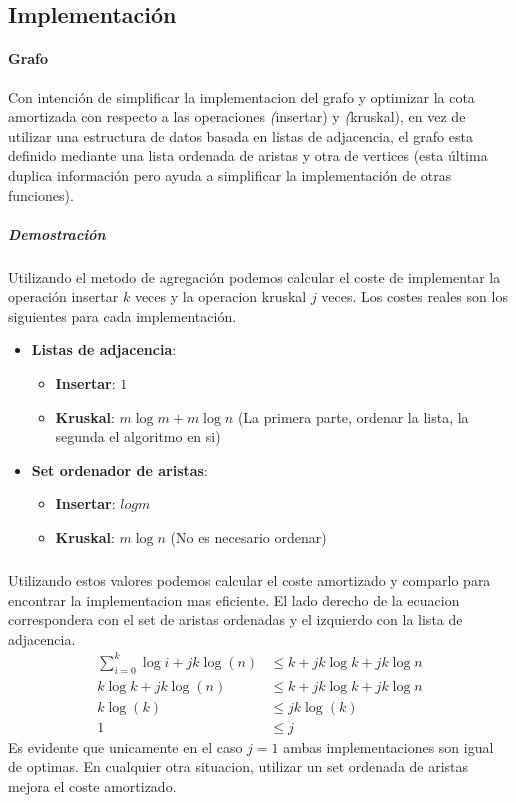 \documentclass{article}
\begin{document}
\subsection{Implementación}

\paragraph{Grafo} Con intención de simplificar la implementacion del grafo y optimizar la cota amortizada con respecto a las operaciones \textit(insertar) y \textit(kruskal), en vez de utilizar una estructura de datos basada en listas de adjacencia, 
el grafo esta definido mediante una lista ordenada de aristas y otra de vertices (esta última duplica información pero ayuda a simplificar la implementación de otras funciones).
\subparagraph{Demostración} Utilizando el metodo de agregación podemos calcular el coste de implementar la operación insertar $k$ veces y la operacion kruskal $j$ veces.
Los costes reales son los siguientes para cada implementación.
\begin{itemize}
\item \textbf{Listas de adjacencia}:
	\begin {itemize}
	\item \textbf{Insertar}: $1$
	\item \textbf{Kruskal}: $m\log{m} + m\log{n}$ (La primera parte, ordenar la lista, la segunda el algoritmo en si)
	\end{itemize}
\item \textbf{Set ordenador de aristas}:
	\begin{itemize}
		\item \textbf{Insertar}: $log{m}$
		\item \textbf{Kruskal}: $m\log{n}$ (No es necesario ordenar)
	\end{itemize}
\end{itemize}
\subparagraph{} Utilizando estos valores podemos calcular el coste amortizado y comparlo para encontrar la implementacion mas eficiente. El lado derecho de la ecuacion correspondera con el set de aristas ordenadas y el izquierdo con la lista de adjacencia.
\begin{align}
	\sum_{i=0}^{k}{\log{i}} + jk\log(n) &\leq k + jk\log{k} + jk\log{n} \\
	k\log{k} + jk\log(n) &\leq k + jk\log{k} + jk\log{n} \\
	k\log(k) &\leq jk\log(k) \\
	1 &\leq j
\end{align}
Es evidente que unicamente en el caso $j=1$ ambas implementaciones son igual de optimas. En cualquier otra situacion, utilizar un set ordenada de aristas mejora el coste amortizado. 
\end{document}
